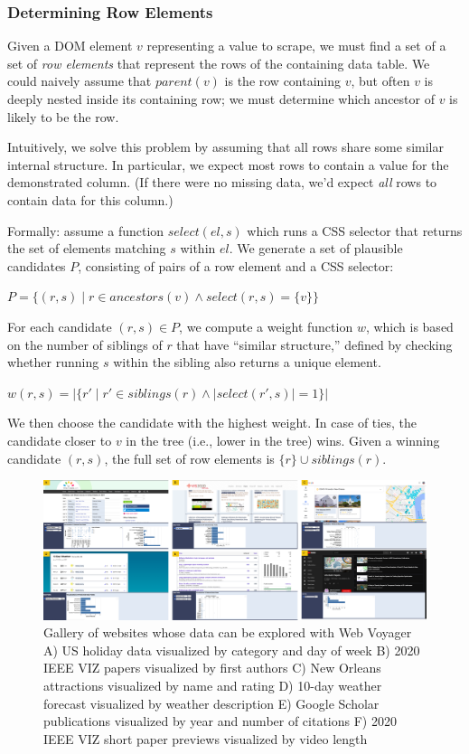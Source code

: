 \documentclass{vgtc}                          %
\begin{document}
\subsubsection{Determining Row Elements}

Given a DOM element \(v\) representing a value to scrape, we must find a
set of a set of \emph{row elements} that represent the rows of the
containing data table. We could naively assume that \(parent(v)\) is the
row containing \(v\), but often \(v\) is deeply nested inside its
containing row; we must determine which ancestor of \(v\) is likely to
be the row.

Intuitively, we solve this problem by assuming that all rows share some
similar internal structure. In particular, we expect most rows to
contain a value for the demonstrated column. (If there were no missing
data, we'd expect \emph{all} rows to contain data for this column.)

Formally: assume a function \(select(el, s)\) which runs a CSS selector
that returns the set of elements matching \(s\) within \(el\). We
generate a set of plausible candidates \(P\), consisting of pairs of a
row element and a CSS selector:

\(P = \{ (r, s) \mid r \in ancestors(v) \land select(r, s) = \{v\} \}\)

For each candidate \((r, s) \in P\), we compute a weight function \(w\),
which is based on the number of siblings of \(r\) that have ``similar
structure,'' defined by checking whether running \(s\) within the
sibling also returns a unique element.

\(w(r, s) = |\{ r' \mid r' \in siblings(r) \land |select(r', s) | = 1 \}|\)

We then choose the candidate with the highest weight. In case of ties,
the candidate closer to \(v\) in the tree (i.e., lower in the tree)
wins. Given a winning candidate \((r, s)\), the full set of row elements
is \(\{r\} \cup siblings(r)\).

\begin{figure}
  \includegraphics[width=\textwidth]{figures/gallery}
  \caption{\label{fig:gallery}Gallery of websites whose data can be explored with Web Voyager
  A) US holiday data visualized by category and day of week
  B) 2020 IEEE VIZ papers visualized by first authors
  C) New Orleans attractions visualized by name and rating
  D) 10-day weather forecast visualized by weather description
  E) Google Scholar publications visualized by year and number of citations
  F) 2020 IEEE VIZ short paper previews visualized by video length}
  \label{fig:gallery}
\end{figure}
\end{document}
